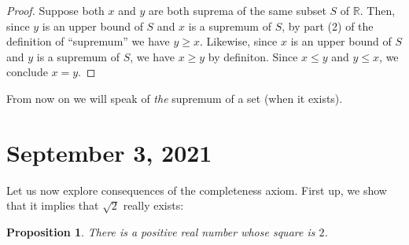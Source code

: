 \documentclass[12pt]{amsart}
\newcommand{\R}{{\mathbb{R}}}
\numberwithin{equation}{section}
\theoremstyle{plain} %
\newtheorem{prop}[equation]{Proposition}
\newcommand{\Sept}[1]{\section{September #1, 2021}}
\theoremstyle{definition}
\theoremstyle{remark}
\begin{document}
\begin{proof} Suppose both $x$ and $y$ are both suprema 
  of the same subset $S$ of $\R$.  Then, since $y$ is an upper bound of $S$ and $x$ is a supremum of $S$, by part (2) of the definition of ``supremum''
  we have $y \geq x$. Likewise, since $x$ is an upper
bound of $S$ and $y$ is a supremum of $S$, we have 
$x \geq y$ by definiton.  Since $x \leq y$ and $y \leq x$, we conclude $x = y$.  
\end{proof}


From now on we will speak of {\em the} supremum of a set (when  it exists).



\Sept{3}



Let us now explore consequences of the completeness axiom. First up, we show that it implies that $\sqrt{2}$ really exists:


\begin{prop} \label{prop116} There is a positive real number whose square is $2$. 
\end{prop}
\end{document}
